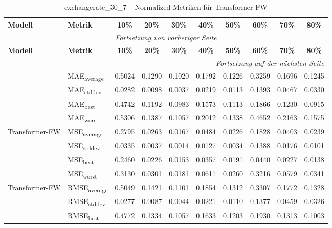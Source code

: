 {\small
\begin{longtable}{l l c c c c c c c c}
    \toprule
    \textbf{Modell} & \textbf{Metrik} & \textbf{10\%} & \textbf{20\%} & \textbf{30\%} & \textbf{40\%} & \textbf{50\%} & \textbf{60\%} & \textbf{70\%} & \textbf{80\%} \\
    \midrule
    \endfirsthead
    \multicolumn{10}{c}{\textit{Fortsetzung von vorheriger Seite}} \\
    \toprule
    \textbf{Modell} & \textbf{Metrik} & \textbf{10\%} & \textbf{20\%} & \textbf{30\%} & \textbf{40\%} & \textbf{50\%} & \textbf{60\%} & \textbf{70\%} & \textbf{80\%} \\
    \midrule
    \endhead
    \midrule
    \multicolumn{10}{r}{\textit{Fortsetzung auf der nächsten Seite}} \\
    \midrule
    \endfoot
    \bottomrule
    \caption{exchangerate_30_7 -- Normalized Metriken für Transformer-FW}
    \label{tab:exchangerate_30_7_normalized_transformer-fw}
    \endlastfoot
\multirow{4}{*}{Transformer-FW} & MAE\textsubscript{average} & 0.5024 & 0.1290 & 0.1020 & 0.1792 & 0.1226 & 0.3259 & 0.1696 & 0.1245 \\
 & MAE\textsubscript{stddev} & 0.0282 & 0.0098 & 0.0037 & 0.0219 & 0.0113 & 0.1393 & 0.0467 & 0.0330 \\
 & MAE\textsubscript{best} & 0.4742 & 0.1192 & 0.0983 & 0.1573 & 0.1113 & 0.1866 & 0.1230 & 0.0915 \\
 & MAE\textsubscript{worst} & 0.5306 & 0.1387 & 0.1057 & 0.2012 & 0.1338 & 0.4652 & 0.2163 & 0.1575 \\
\cmidrule(lr){2-10}
\multirow{4}{*}{Transformer-FW} & MSE\textsubscript{average} & 0.2795 & 0.0263 & 0.0167 & 0.0484 & 0.0226 & 0.1828 & 0.0403 & 0.0239 \\
 & MSE\textsubscript{stddev} & 0.0335 & 0.0037 & 0.0014 & 0.0127 & 0.0034 & 0.1388 & 0.0176 & 0.0101 \\
 & MSE\textsubscript{best} & 0.2460 & 0.0226 & 0.0153 & 0.0357 & 0.0191 & 0.0440 & 0.0227 & 0.0138 \\
 & MSE\textsubscript{worst} & 0.3130 & 0.0301 & 0.0181 & 0.0611 & 0.0260 & 0.3216 & 0.0579 & 0.0341 \\
\cmidrule(lr){2-10}
\multirow{4}{*}{Transformer-FW} & RMSE\textsubscript{average} & 0.5049 & 0.1421 & 0.1101 & 0.1854 & 0.1312 & 0.3307 & 0.1772 & 0.1328 \\
 & RMSE\textsubscript{stddev} & 0.0277 & 0.0087 & 0.0044 & 0.0221 & 0.0110 & 0.1377 & 0.0459 & 0.0326 \\
 & RMSE\textsubscript{best} & 0.4772 & 0.1334 & 0.1057 & 0.1633 & 0.1203 & 0.1930 & 0.1313 & 0.1003 \\

\end{longtable}}
